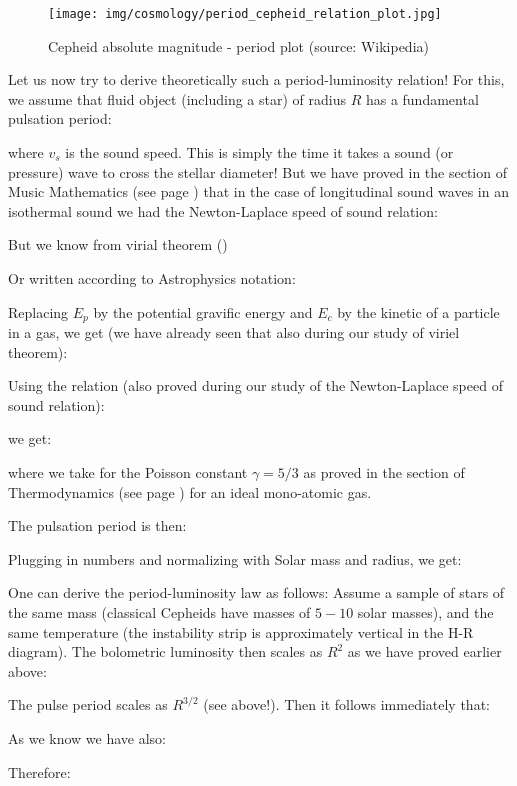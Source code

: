 	\begin{figure}[H]
		\centering
		\texttt{[image: img/cosmology/period\_cepheid\_relation\_plot.jpg]}
		\caption[Cepheid absolute magnitude - period plot]{Cepheid absolute magnitude - period plot (source: Wikipedia)}
	\end{figure}
	Let us now try to derive theoretically such a period-luminosity relation! For this, we assume that fluid object (including a star) of radius $R$ has a fundamental pulsation period: 
	
	where $v_s$ is the sound speed. This is simply the time it takes a sound (or pressure) wave to cross the stellar diameter! But we have proved in the section of Music Mathematics (see page \pageref{Newton-Laplace speed of sound relation}) that in the case of longitudinal sound waves in an isothermal sound we had the Newton-Laplace speed of sound relation:
	
	But we know from virial theorem ()
	
	Or written according to Astrophysics notation:
	
	Replacing $E_p$ by the potential gravific energy and $E_c$ by the kinetic of a particle in a gas, we get (we have already seen that also during our study of viriel theorem):
	
	Using the relation (also proved during our study of the Newton-Laplace speed of sound relation):
	
	we get:
	
	where we take for the Poisson constant $\gamma=5/3$ as proved in the section of Thermodynamics (see page \pageref{Poissons constant}) for an ideal mono-atomic gas.
	
	The pulsation period is then:
	
	Plugging in numbers and normalizing with Solar mass and radius, we get:
	
	One can derive the period-luminosity law as follows: Assume a sample of stars of the same mass (classical Cepheids have masses of $5-10$ solar masses), and the same temperature (the instability strip is approximately vertical in the H-R diagram). The bolometric luminosity then scales as $R^2$ as we have proved earlier above:
	 
	The pulse period scales as $R^{3/2}$ (see above!). Then it follows immediately that:
	
	As we know we have also:
	
	Therefore:
	
